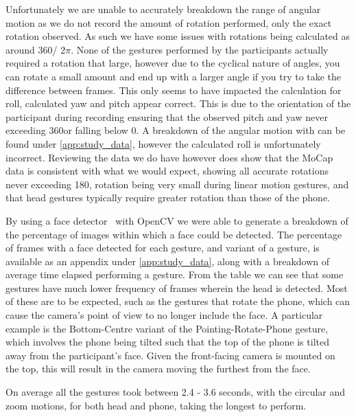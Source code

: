 Unfortunately we are unable to accurately breakdown the range of angular motion as we do not record the amount of rotation performed, only the exact rotation observed. As such we have some issues with rotations being calculated as around 360\textdegree / 2$\pi$. None of the gestures performed by the participants actually required a rotation that large, however due to the cyclical nature of angles, you can rotate a small amount and end up with a larger angle if you try to take the difference between frames. 
This only seems to have impacted the calculation for roll, calculated yaw and pitch appear correct. This is due to the orientation of the participant during recording ensuring that the observed pitch and yaw never exceeding 360\textdegree or falling below 0\textdegree. A breakdown of the angular motion with can be found under \autoref{app:study_data}, however the calculated roll is unfortunately incorrect.
Reviewing the data we do have however does show that the MoCap data is consistent with what we would expect, showing all accurate rotations never exceeding 180\textdegree, rotation being very small during linear motion gestures, and that head gestures typically require greater rotation than those of the phone.

By using a face detector~\cite{yu2022yunet} with OpenCV we were able to generate a breakdown of the percentage of images within which a face could be detected. The percentage of frames with a face detected for each gesture, and variant of a gesture, is available as an appendix under \autoref{app:study_data}, along with a breakdown of average time elapsed performing a gesture. 
From the table we can see that some gestures have much lower frequency of frames wherein the head is detected. Most of these are to be expected, such as the gestures that rotate the phone, which can cause the camera's point of view to no longer include the face. A particular example is the Bottom-Centre variant of the Pointing-Rotate-Phone gesture, which involves the phone being tilted such that the top of the phone is tilted away from the participant's face. Given the front-facing camera is mounted on the top, this will result in the camera moving the furthest from the face.

On average all the gestures took between 2.4 - 3.6 seconds, with the circular and zoom motions, for both head and phone, taking the longest to perform.
